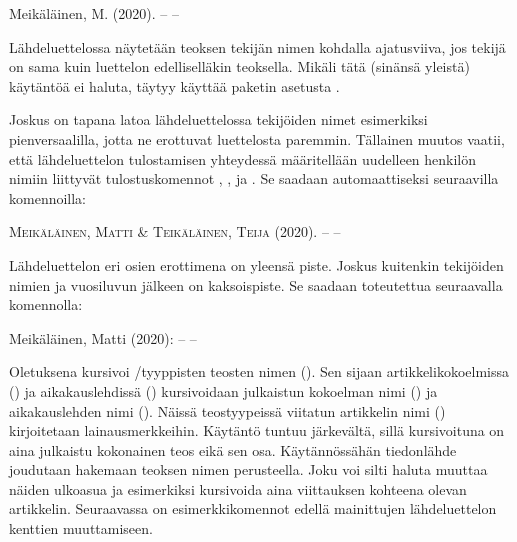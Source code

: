 \begin{tulossis}
  Meikäläinen, M. (2020). -- --
\end{tulossis}

Lähdeluettelossa näytetään teoksen tekijän nimen kohdalla ajatusviiva,
jos tekijä on sama kuin luettelon edelliselläkin teoksella. Mikäli tätä
(sinänsä yleistä) käytäntöä ei haluta, täytyy käyttää paketin asetusta
.

\begin{koodilohkosis}
  \usepackage[…, dashed=false]{biblatex}
\end{koodilohkosis}

Joskus on tapana latoa lähdeluettelossa tekijöiden nimet esimerkiksi
pienversaalilla, jotta ne erottuvat luettelosta paremmin. Tällainen
muutos vaatii, että lähdeluettelon tulostamisen yhteydessä määritellään
uudelleen henkilön nimiin liittyvät tulostuskomennot , ,
 ja . Se saadaan automaattiseksi seuraavilla
komennoilla:


\begin{koodilohkosis}
\end{koodilohkosis}

\begin{tulossis}
  \textsc{Meikäläinen}, \textsc{Matti} \& \textsc{Teikäläinen},
  \textsc{Teija} (2020). -- --
\end{tulossis}

Lähdeluettelon eri osien erottimena on yleensä piste. Joskus kuitenkin
tekijöiden nimien ja vuosiluvun jälkeen on kaksoispiste. Se saadaan
toteutettua seuraavalla komennolla:


\begin{koodilohkosis}
\end{koodilohkosis}

\begin{tulossis}
  Meikäläinen, Matti (2020): -- --
\end{tulossis}

Oletuksena  kursivoi \-/tyyppisten teosten
nimen (). Sen sijaan artikkelikokoelmissa
() ja aikakauslehdissä ()
kursivoidaan julkaistun kokoelman nimi () ja
aikakauslehden nimi (). Näissä teostyypeissä
viitatun artikkelin nimi () kirjoitetaan lainausmerkkeihin.
Käytäntö tuntuu järkevältä, sillä kursivoituna on aina julkaistu
kokonainen teos eikä sen osa. Käytännössähän tiedonlähde joudutaan
hakemaan teoksen nimen perusteella. Joku voi silti haluta muuttaa näiden
ulkoasua ja esimerkiksi kursivoida aina viittauksen kohteena olevan
artikkelin. Seuraavassa on esimerkkikomennot edellä mainittujen
lähdeluettelon kenttien muuttamiseen.

